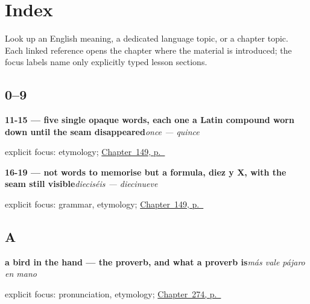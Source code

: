 
\chapter*{Index}

Look up an English meaning, a dedicated language topic, or a chapter topic. Each linked reference opens the chapter where the material is introduced; the focus labels name only explicitly typed lesson sections.

\section*{0--9}

\noindent\begin{minipage}[t]{\linewidth}
\raggedright
\textbf{11-15 — five single opaque words, each one a Latin compound worn down until the seam disappeared}\enspace\emph{once — quince}\par
\footnotesize explicit focus: etymology; \hyperref[ch:spanish-numbers-eleven-to-twenty]{Chapter~149, p.~\pageref*{ch:spanish-numbers-eleven-to-twenty}}
\end{minipage}\par\smallskip

\noindent\begin{minipage}[t]{\linewidth}
\raggedright
\textbf{16-19 — not words to memorise but a formula, diez y X, with the seam still visible}\enspace\emph{dieciséis — diecinueve}\par
\footnotesize explicit focus: grammar, etymology; \hyperref[ch:spanish-numbers-eleven-to-twenty]{Chapter~149, p.~\pageref*{ch:spanish-numbers-eleven-to-twenty}}
\end{minipage}\par\smallskip

\section*{A}

\noindent\begin{minipage}[t]{\linewidth}
\raggedright
\textbf{a bird in the hand — the proverb, and what a proverb is}\enspace\emph{más vale pájaro en mano}\par
\footnotesize explicit focus: pronunciation, etymology; \hyperref[ch:peso-cultural]{Chapter~274, p.~\pageref*{ch:peso-cultural}}
\end{minipage}\par\smallskip

